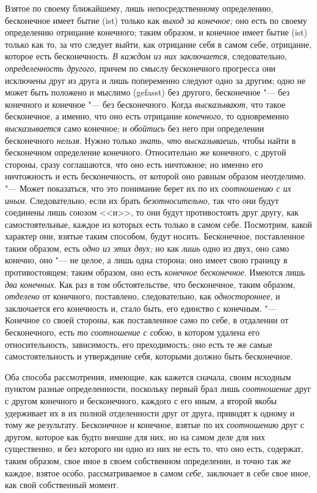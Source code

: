 Взятое по своему ближайшему, лишь непосредственному определению, бесконечное
имеет бытие (ist) только как {\em выход за конечное;}
оно есть по своему определению отрицание конечного; таким образом, и
конечное имеет бытие (ist) только как то, за что следует выйти, как
отрицание себя в самом себе, отрицание, которое есть бесконечность.
{\em В каждом из них заключается}, следовательно,
{\em определенность другого}, причем по смыслу
бесконечного прогресса они исключены друг из друга и лишь попеременно
следуют одно за другим; одно не может быть положено и мыслимо (gefasst) без
другого, бесконечное "--- без конечного и конечное "--- без бесконечного. Когда
{\em высказывают}, что такое бесконечное, а именно, что
оно есть отрицание {\em конечного}, то одновременно
{\em высказывается} само конечное; и
{\em обойтись} без него при определении бесконечного
{\em нельзя}. Нужно только
{\em знать, что высказываешь}, чтобы найти в
бесконечном определение конечного. Относительно же конечного, с другой
стороны, сразу соглашаются, что оно есть ничтожное; но именно его
ничтожность и есть бесконечность, от которой оно равным образом неотделимо.
"--- Может показаться, что это понимание берет их по их
{\em соотношению с их иным}. Следовательно, если их
брать {\em безотносительно}, так что они будут
соединены лишь союзом <<и>>, то они будут противостоять друг другу, как
самостоятельные, каждое из которых есть только в самом себе. Посмотрим,
какой характер они, взятые таким способом, будут носить. Бесконечное,
поставленное таким образом, есть {\em одно из этих
двух;} но как {\em лишь} одно из двух, оно само
конечно, оно "--- не целое, а лишь одна сторона; оно имеет свою границу в
противостоящем; таким образом, оно есть {\em конечное
бесконечное}. Имеются лишь {\em два конечных}. Как раз
в том обстоятельстве, что бесконечное, таким образом,
{\em отделено} от конечного, поставлено, следовательно,
как {\em одностороннее}, и заключается его конечность
и, стало быть, его единство с конечным. "--- Конечное со своей стороны, как
поставленное само по себе, в отдалении от бесконечного, есть
{\em то соотношение с собою}, в котором удалена его
относительность, зависимость, его преходимость; оно есть те же самые
самостоятельность и утверждение себя, которыми должно быть бесконечное.

Оба способа рассмотрения, имеющие, как кажется сначала, своим исходным
пунктом разные определенности, поскольку первый брал лишь
{\em соотношение} друг с другом конечного и
бесконечного, каждого с его иным, а второй якобы удерживает их в их
полной отделенности друг от друга, приводят к одному и тому же результату.
Бесконечное и конечное, взятые по их {\em соотношению}
друг с другом, которое как будто внешне для них, но на самом деле для них
существенно, и без которого ни одно из них не есть то, что оно есть,
содержат, таким образом, свое иное в своем собственном определении, и
точно так же каждое, взятое {\em особо},
рассматриваемое в самом {\em себе}, заключает в себе
свое иное, как свой собственный момент.

